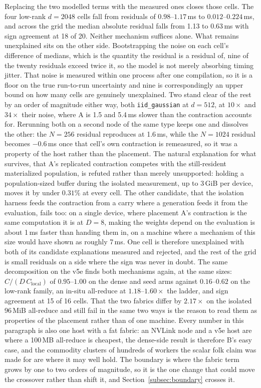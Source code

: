 Replacing the two modelled terms with the measured ones closes those cells.
The four low-rank $d{=}2048$ cells fall from residuals of $0.98$--$1.17$\,ms
to $0.012$--$0.224$\,ms, and across the grid the median absolute residual
falls from 1.13 to 0.63\,ms with sign agreement at 18 of 20. Neither
mechanism suffices alone. What remains unexplained sits on the other side.
Bootstrapping the noise on each cell's difference of medians, which is the
quantity the residual is a residual of, nine of the twenty residuals exceed
twice it, so the model is not merely absorbing timing jitter. That noise is
measured within one process after one compilation, so it is a floor on the
true run-to-run uncertainty and nine is correspondingly an upper bound on how
many cells are genuinely unexplained. Two stand clear of the rest by an order
of magnitude either way, both \texttt{iid\_gaussian} at $d{=}512$, at
$10\times$ and $34\times$ their noise, where A is 1.5 and 5.4\,ms slower than
the contraction accounts for. Rerunning both on a second node of the same type
keeps one and dissolves the other: the $N{=}256$ residual reproduces at
1.6\,ms, while the $N{=}1024$ residual becomes $-0.6$\,ms once that cell's own
contraction is remeasured, so it was a property of the host rather than the
placement. The natural explanation for what survives, that A's replicated
contraction competes with the still-resident materialized population, is
refuted rather than merely unsupported: holding a population-sized buffer
during the isolated measurement, up to 3\,GiB per device, moves it by under
$0.31\%$ at every cell. The other candidate, that the isolation harness
feeds the contraction from a carry where a generation feeds it from the
evaluation, fails too: on a single device, where placement A's contraction is
the same computation it is at $D{=}8$, making the weights depend on the
evaluation is about 1\,ms faster than handing them in, on a machine where a
mechanism of this size would have shown as roughly 7\,ms. One cell is therefore
unexplained with both of its candidate explanations measured and rejected, and
the rest of the grid is small residuals on a side where the sign was never in
doubt. The same decomposition on the v5e finds
both mechanisms again, at the same sizes: $C/(D\,C_{\mathrm{local}})$ of
$0.95$--$1.00$ on the dense and seed arms against $0.16$--$0.62$ on the
low-rank family, an in-situ all-reduce at $1.18$--$1.60\times$ the ladder,
and sign agreement at 15 of 16 cells. That the two fabrics differ by
$2.17\times$ on the isolated 96\,MiB all-reduce and still fail in the same
two ways is the reason to read them as properties of the placement rather
than of one machine. Every number in this paragraph is also one host with a
fat fabric: an NVLink node and a v5e host are where a 100\,MB all-reduce is
cheapest, the dense-side result is therefore B's easy case, and the commodity
clusters of hundreds of workers the scalar folk claim was made for
\citep{salimans2017} are where it may well hold. The boundary is where the
fabric term grows by one to two orders of magnitude, so it is the one change
that could move the crossover rather than shift it, and
Section~\ref{subsec:boundary} crosses it.

